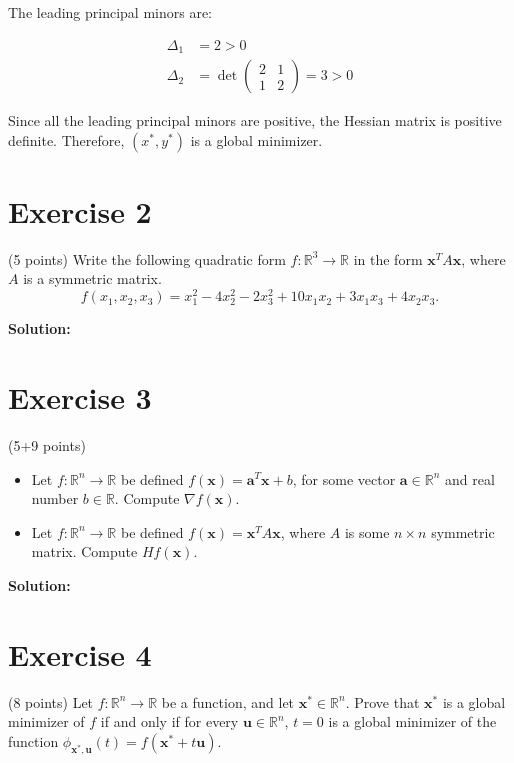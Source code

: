 \documentclass{article}
\begin{document}
The leading principal minors are:

\begin{align*}
    \Delta_1 &= 2 > 0 \\
    \Delta_2 &= \det\begin{pmatrix}
        2 & 1 \\
        1 & 2
    \end{pmatrix} = 3 > 0
\end{align*}

Since all the leading principal minors are positive, the Hessian matrix is positive definite. Therefore, $(x^*,y^*)$ is a global minimizer. \\

\newpage

\section*{Exercise 2}
(5 points) Write the following quadratic form $f: \mathbb{R}^3 \to \mathbb{R}$ in the form $\mathbf{x}^T A\mathbf{x}$, where $A$ is a symmetric matrix.
$$f(x_1,x_2,x_3) = x_1^2 - 4x_2^2 - 2x_3^2 + 10x_1x_2 + 3x_1x_3 + 4x_2x_3.$$

\textbf{Solution:}

\newpage

\section*{Exercise 3}
(5+9 points)
\begin{itemize}
    \item Let $f: \mathbb{R}^n \to \mathbb{R}$ be defined $f(\mathbf{x}) = \mathbf{a}^T\mathbf{x} + b$, for some vector $\mathbf{a} \in \mathbb{R}^n$ and real number $b \in \mathbb{R}$. Compute $\nabla f(\mathbf{x})$.
    \item Let $f: \mathbb{R}^n \to \mathbb{R}$ be defined $f(\mathbf{x}) = \mathbf{x}^T A\mathbf{x}$, where $A$ is some $n \times n$ symmetric matrix. Compute $Hf(\mathbf{x})$.
\end{itemize}

\textbf{Solution:}

\newpage

\section*{Exercise 4}
(8 points) Let $f: \mathbb{R}^n \to \mathbb{R}$ be a function, and let $\mathbf{x}^* \in \mathbb{R}^n$. Prove that $\mathbf{x}^*$ is a global minimizer of $f$ if and only if for every $\mathbf{u} \in \mathbb{R}^n$, $t = 0$ is a global minimizer of the function $\phi_{\mathbf{x}^*,\mathbf{u}}(t) = f(\mathbf{x}^* + t\mathbf{u})$. \\
\end{document}
